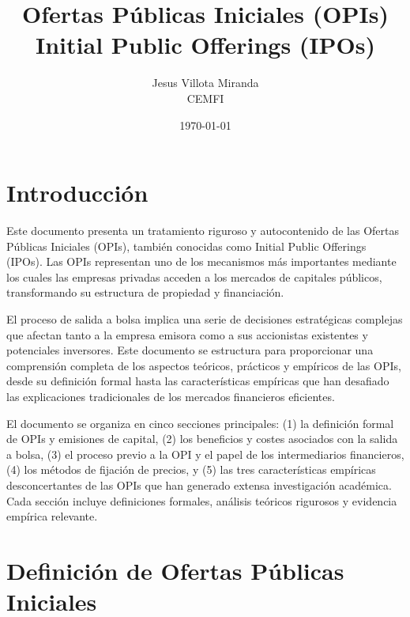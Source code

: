 

\title{\textbf{Ofertas Públicas Iniciales (OPIs)}\\
\large Initial Public Offerings (IPOs)}
\author{Jesus Villota Miranda\\
CEMFI}
\date{\today}



\maketitle

\tableofcontents
\newpage

\section{Introducción}

Este documento presenta un tratamiento riguroso y autocontenido de las Ofertas Públicas Iniciales (OPIs), también conocidas como Initial Public Offerings (IPOs). Las OPIs representan uno de los mecanismos más importantes mediante los cuales las empresas privadas acceden a los mercados de capitales públicos, transformando su estructura de propiedad y financiación.

El proceso de salida a bolsa implica una serie de decisiones estratégicas complejas que afectan tanto a la empresa emisora como a sus accionistas existentes y potenciales inversores. Este documento se estructura para proporcionar una comprensión completa de los aspectos teóricos, prácticos y empíricos de las OPIs, desde su definición formal hasta las características empíricas que han desafiado las explicaciones tradicionales de los mercados financieros eficientes.

El documento se organiza en cinco secciones principales: (1) la definición formal de OPIs y emisiones de capital, (2) los beneficios y costes asociados con la salida a bolsa, (3) el proceso previo a la OPI y el papel de los intermediarios financieros, (4) los métodos de fijación de precios, y (5) las tres características empíricas desconcertantes de las OPIs que han generado extensa investigación académica. Cada sección incluye definiciones formales, análisis teóricos rigurosos y evidencia empírica relevante.

\section{Definición de Ofertas Públicas Iniciales}

